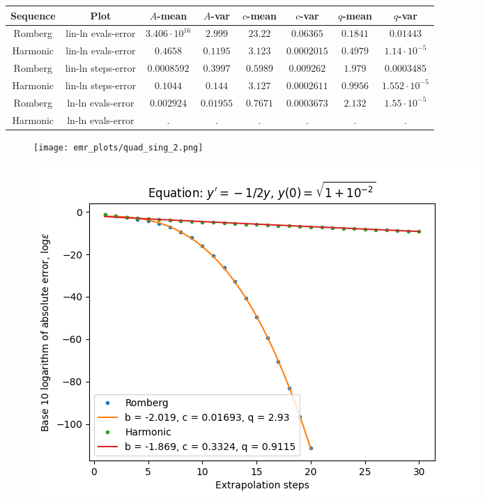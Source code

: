\begin{table}[H]
    \centering
    \small
     \begin{tabular}{c|c||c|c|c|c|c|c}
Sequence & Plot & \(A\)-mean & \(A\)-var & \(c\)-mean & \(c\)-var & \(q\)-mean & \(q\)-var\\\hline
Romberg & lin-ln evals-error & \(3.406\cdot 10^{16}\) & \(2.999\) & \(23.22\) & \(0.06365\) & \(0.1841\) & \(0.01443\) \\
Harmonic & lin-ln evals-error & \(0.4658\) & \(0.1195\) & \(3.123\) & \(0.0002015\) & \(0.4979\) & \(1.14\cdot 10^{-5}\) \\
Romberg & lin-ln steps-error & \(0.0008592\) & \(0.3997\) & \(0.5989\) & \(0.009262\) & \(1.979\) & \(0.0003485\) \\
Harmonic & lin-ln steps-error & \(0.1044\) & \(0.144\) & \(3.127\) & \(0.0002611\) & \(0.9956\) & \(1.552\cdot 10^{-5}\) \\
Romberg & ln-ln evals-error & \(0.002924\) & \(0.01955\) & \(0.7671\) & \(0.0003673\) & \(2.132\) & \(1.55\cdot 10^{-5}\) \\
Harmonic & ln-ln evals-error & . & . & . & . & . & . \\
    \end{tabular}
    \label{tab:my_label}
\end{table}

\begin{figure}[H]
\centering
\begin{minipage}{0.45\textwidth}
\centering
\texttt{[image: emr\_plots/quad\_sing\_2.png]}
\end{minipage}
\begin{minipage}{0.45\textwidth}
\centering
\includegraphics[scale=0.45]{emr_plots/quad_sing_2_hp_steps.png}
\end{minipage}
\end{figure}

